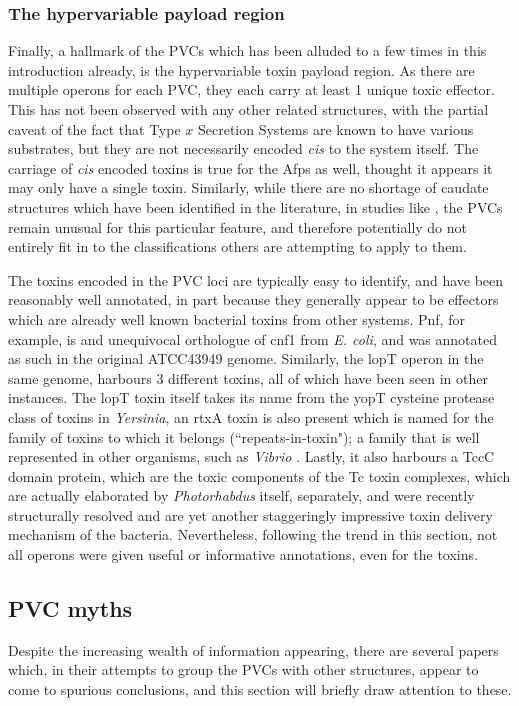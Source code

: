 \subsubsection{The hypervariable payload region}
Finally, a hallmark of the PVCs which has been alluded to a few times in this introduction already, is the hypervariable toxin payload region. As there are multiple operons for each PVC, they each carry at least 1 unique toxic effector. This has not been observed with any other related structures, with the partial caveat of the fact that Type $x$ Secretion Systems are known to have various substrates, but they are not necessarily encoded \emph{cis} to the system itself. The carriage of \emph{cis} encoded toxins is true for the Afps as well, thought it appears it may only have a single toxin. Similarly, while there are no shortage of caudate structures which have been identified in the literature, in studies like \cite{Sarris2014}, the PVCs remain unusual for this particular feature, and therefore potentially do not entirely fit in to the classifications others are attempting to apply to them.

The toxins encoded in the PVC loci are typically easy to identify, and have been reasonably well annotated, in part because they generally appear to be effectors which are already well known bacterial toxins from other systems. Pnf, for example, is and unequivocal orthologue of cnf1 from \emph{E. coli}, and was annotated as such in the original ATCC43949 genome. Similarly, the lopT operon in the same genome, harbours 3 different toxins, all of which have been seen in other instances. The lopT toxin itself takes its name from the yopT cysteine protease class of toxins in \emph{Yersinia}, an rtxA toxin is also present which is named for the family of toxins to which it belongs (``repeats-in-toxin"); a family that is well represented in other organisms, such as \emph{Vibrio} \citep{Lin1999}. Lastly, it also harbours a TccC domain protein, which are the toxic components of the Tc toxin complexes, which are actually elaborated by \emph{Photorhabdus} itself, separately, and were recently structurally resolved \citep{Bowen1998, Meusch2014} and are yet another staggeringly impressive toxin delivery mechanism of the bacteria. Nevertheless, following the trend in this section, not all operons were given useful or informative annotations, even for the toxins.


\subsection{PVC myths}
Despite the increasing wealth of information appearing, there are several papers which, in their attempts to group the PVCs with other structures, appear to come to spurious conclusions, and this section will briefly draw attention to these.

